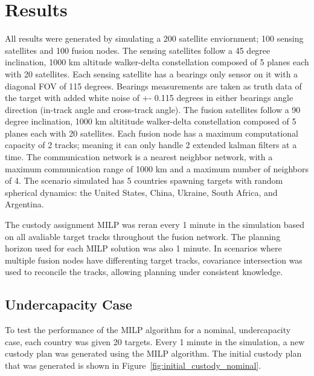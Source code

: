 \section{Results}

    All results were generated by simulating a 200 satellite enviornment; 100 sensing satellites and 100 fusion nodes.
    The sensing satellites follow a 45 degree inclination, 1000 km altitude walker-delta constellation composed of 5 planes each with 20 satellites.
    Each sensing satellite has a bearings only sensor on it with a diagonal FOV of 115 degrees. Bearings measurements are taken as truth data of the target with added white noise of +- 0.115 degrees in either bearings angle direction (in-track angle and cross-track angle).
    The fusion satellites follow a 90 degree inclination, 1000 km altititude walker-delta constellation composed of 5 planes each with 20 satellites.
    Each fusion node has a maximum computational capacity of 2 tracks; meaning it can only handle 2 extended kalman filters at a time. 
    The communication network is a nearest neighbor network, with a maximum communication range of 1000 km and a maximum number of neighbors of 4.
    The scenario simulated has 5 countries spawning targets with random spherical dynamics: the United States, China, Ukraine, South Africa, and Argentina.

    The custody assignment MILP was reran every 1 minute in the simulation based on all avaliable target tracks throughout the fusion network.
    The planning horizon used for each MILP solution was also 1 minute.
    In scenarios where multiple fusion nodes have differenting target tracks, covariance intersection was used to reconcile the tracks, allowing planning under consistent knowledge.

\subsection{Undercapacity Case}



    To test the performance of the MILP algorithm for a nominal, undercapacity case, each country was given 20 targets. 
    Every 1 minute in the simulation, a new custody plan was generated using the MILP algorithm. 
    The initial custody plan that was generated is shown in Figure~\ref{fig:initial_custody_nominal}.

